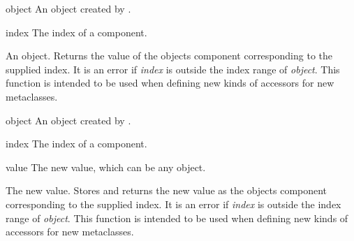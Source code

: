 \begin{optDefinition}
%
\begin{arguments}
    \item[object] An object created by .
    \item[index] The index of a component.
\end{arguments}
%
\result%
An object.
%
\remarks%
Returns the value of the objects component corresponding to the supplied index.
It is an error if {\em index} is outside the index range of {\em object}.  This
function is intended to be used when defining new kinds of accessors for new
metaclasses.

%
\begin{arguments}
    \item[object] An object created by .
    \item[index] The index of a component.
    \item[value] The new value, which can be any object.
\end{arguments}
%
\result%
The new value.
%
\remarks%
Stores and returns the new value as the objects component corresponding to the
supplied index.  It is an error if {\em index} is outside the index range of
{\em object}.  This function is intended to be used when defining new kinds of
accessors for new metaclasses.

\end{optDefinition}
